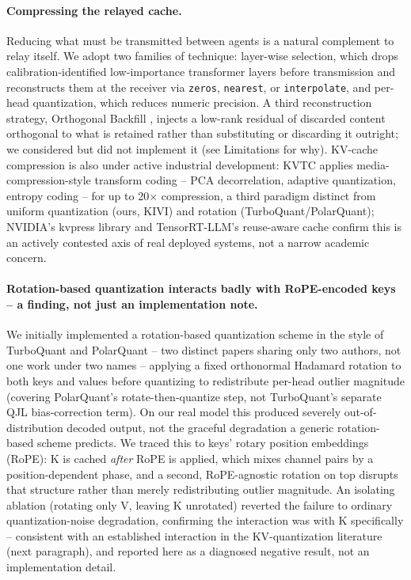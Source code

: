 \documentclass[11pt]{article}
\begin{document}
\paragraph{Compressing the relayed cache.} Reducing what must be
transmitted between agents is a natural complement to relay itself. We
adopt two families of technique: layer-wise selection, which drops
calibration-identified low-importance transformer layers before
transmission and reconstructs them at the receiver via \texttt{zeros},
\texttt{nearest}, or \texttt{interpolate}, and per-head quantization,
which reduces numeric precision. A third reconstruction strategy,
Orthogonal Backfill \citep{orthobackfill2026}, injects a low-rank residual
of discarded content orthogonal to what is retained rather than
substituting or discarding it outright; we considered but did not
implement it (see Limitations for why). KV-cache compression is also
under active industrial development: KVTC \citep{kvtc2026} applies
media-compression-style transform coding -- PCA decorrelation, adaptive
quantization, entropy coding -- for up to 20$\times$ compression, a third
paradigm distinct from uniform quantization (ours, KIVI) and rotation
(TurboQuant/PolarQuant); NVIDIA's kvpress library and TensorRT-LLM's
reuse-aware cache confirm this is an actively contested axis of real
deployed systems, not a narrow academic concern.

\paragraph{Rotation-based quantization interacts badly with RoPE-encoded
keys -- a finding, not just an implementation note.} We initially
implemented a rotation-based quantization scheme in the style of
TurboQuant \citep{turboquant2026} and PolarQuant \citep{polarquant2026} --
two distinct papers sharing only two authors, not one work under two
names -- applying a fixed orthonormal Hadamard rotation to both keys and
values before quantizing to redistribute per-head outlier magnitude
(covering PolarQuant's rotate-then-quantize step, not TurboQuant's
separate QJL bias-correction term). On our real model this produced
severely out-of-distribution decoded output, not the graceful degradation
a generic rotation-based scheme predicts. We traced this to keys' rotary
position embeddings (RoPE): K is cached \emph{after} RoPE is applied,
which mixes channel pairs by a position-dependent phase, and a second,
RoPE-agnostic rotation on top disrupts that structure rather than merely
redistributing outlier magnitude. An isolating ablation (rotating only V,
leaving K unrotated) reverted the failure to ordinary quantization-noise
degradation, confirming the interaction was with K specifically --
consistent with an established interaction in the KV-quantization
literature (next paragraph), and reported here as a diagnosed negative
result, not an implementation detail.
\end{document}
